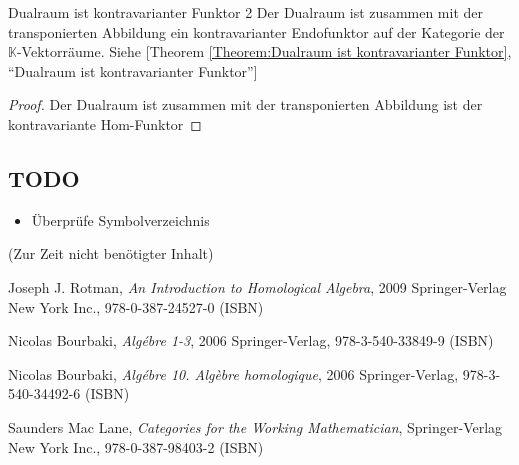\documentclass[a4paper]{amsart}
\theoremstyle{definition}
\newcommand{\myRef}[2]{[#1 \ref{#1:#2}, ``#2'']}
\newcommand{\K}{\ensuremath{\mathbb{ K }}}
\begin{document}
\begin{Satz}{Dualraum ist kontravarianter Funktor 2}
   Der Dualraum ist zusammen mit der transponierten Abbildung ein kontravarianter Endofunktor auf der Kategorie der $\K$-Vektorräume. Siehe \myRef{Theorem}{Dualraum ist kontravarianter Funktor}   
\end{Satz}
\begin{proof}
   Der Dualraum ist zusammen mit der transponierten Abbildung ist der kontravariante Hom-Funktor 
\end{proof}

\begin{backup}
\section{TODO}
\begin{itemize}
     \item Überprüfe Symbolverzeichnis
\end{itemize}


\end{backup}

\begin{backup}
    (Zur Zeit nicht benötigter Inhalt)
\end{backup}

\begin{thebibliography}{9}
   	Joseph J. Rotman, \emph{An Introduction to Homological Algebra},
   	2009 Springer-Verlag New York Inc., 978-0-387-24527-0 (ISBN)

      Nicolas Bourbaki, \emph{Algébre 1-3},
      2006 Springer-Verlag, 978-3-540-33849-9 (ISBN)

      Nicolas Bourbaki, \emph{Algébre 10. Algèbre homologique},
      2006 Springer-Verlag, 978-3-540-34492-6 (ISBN)

      Saunders Mac Lane, \emph{Categories for the Working Mathematician},
      Springer-Verlag New York Inc., 978-0-387-98403-2 (ISBN)

\end{thebibliography}
\end{document}
